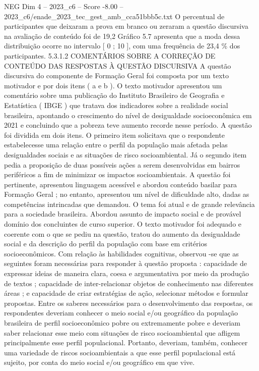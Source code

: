 \begin{textsample}{NEG Dim 4 – 2023\_c6 – Score -8.00 – 2023\_c6/enade\_2023\_tec\_gest\_amb\_cca51bbb5c.txt}
O percentual de participantes que deixaram a prova em branco ou zeraram a questão discursiva na avaliação de conteúdo foi de 19,2 Gráfico 5.7 apresenta que a moda dessa distribuição ocorre no intervalo [ 0 ; 10 ], com uma frequência de 23,4 \% dos participantes. 5.3.1.2 COMENTÁRIOS SOBRE A CORREÇÃO DE CONTEÚDO DAS RESPOSTAS À QUESTÃO DISCURSIVA A questão discursiva do componente de Formação Geral foi composta por um texto motivador e por dois itens ( a e b ).
O texto motivador apresentou um comentário sobre uma publicação do Instituto Brasileiro de Geografia e Estatística ( IBGE ) que tratava dos indicadores sobre a realidade social brasileira, apontando o crescimento do nível de desigualdade socioeconômica em 2021 e concluindo que a pobreza teve aumento recorde nesse período.
A questão foi dividida em dois itens.
O primeiro item solicitava que o respondente estabelecesse uma relação entre o perfil da população mais afetada pelas desigualdades sociais e as situações de risco socioambiental.
Já o segundo item pedia a proposição de duas possíveis ações a serem desenvolvidas em bairros periféricos a fim de minimizar os impactos socioambientais.
A questão foi pertinente, apresentou linguagem acessível e abordou conteúdo basilar para Formação Geral ; no entanto, apresentou um nível de dificuldade alto, dadas as competências intrincadas que demandou.
O tema foi atual e de grande relevância para a sociedade brasileira.
Abordou assunto de impacto social e de provável domínio dos concluintes de curso superior.
O texto motivador foi adequado e coerente com o que se pediu na questão, tratou do aumento da desigualdade social e da descrição do perfil da população com base em critérios socioeconômicos.
Com relação às habilidades cognitivas, observou -se que as seguintes foram necessárias para responder à questão proposta : capacidade de expressar ideias de maneira clara, coesa e argumentativa por meio da produção de textos ; capacidade de inter-relacionar objetos de conhecimento nas diferentes áreas ; e capacidade de criar estratégias de ação, selecionar métodos e formular propostas.
Entre os saberes necessários para o desenvolvimento das respostas, os respondentes deveriam conhecer o meio social e/ou geográfico da população brasileira de perfil socioeconômico pobre ou extremamente pobre e deveriam saber relacionar esse meio com situações de risco socioambiental que afligem principalmente esse perfil populacional.
Portanto, deveriam, também, conhecer uma variedade de riscos socioambientais a que esse perfil populacional está sujeito, por conta do meio social e/ou geográfico em que vive.

\end{textsample}
